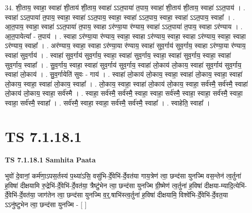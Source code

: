 \documentclass[17pt]{extarticle}
\begin{document}
34. शी॒ताय॒ स्वाहा॒ स्वाहा॑ शी॒ताय॑ शी॒ताय॒ स्वाहा॑ ऽऽत॒पाया॑ त॒पाय॒ स्वाहा॑ शी॒ताय॑ शी॒ताय॒ स्वाहा॑ ऽऽत॒पाय॑ । . स्वाहा॑ ऽऽत॒पाया॑ त॒पाय॒ स्वाहा॒ स्वाहा॑ ऽऽत॒पाय॒ स्वाहा॒ स्वाहा॑ ऽऽत॒पाय॒ स्वाहा॒ स्वाहा॑ ऽऽत॒पाय॒ स्वाहा᳚ । . आ॒त॒पाय॒ स्वाहा॒ स्वाहा॑ ऽऽत॒पाया॑ त॒पाय॒ स्वाहा ऽर॑ण्या॒या र॑ण्याय॒ स्वाहा॑ ऽऽत॒पाया॑ त॒पाय॒ स्वाहा ऽर॑ण्याय । . आ॒त॒पायेत्या᳚ - त॒पाय॑ । . स्वाहा ऽर॑ण्या॒या र॑ण्याय॒ स्वाहा॒ स्वाहा ऽर॑ण्याय॒ स्वाहा॒ स्वाहा ऽर॑ण्याय॒ स्वाहा॒ स्वाहा ऽर॑ण्याय॒ स्वाहा᳚ । . अर॑ण्याय॒ स्वाहा॒ स्वाहा ऽर॑ण्या॒या र॑ण्याय॒ स्वाहा॑ सुव॒र्गाय॑ सुव॒र्गाय॒ स्वाहा ऽर॑ण्या॒या र॑ण्याय॒ स्वाहा॑ सुव॒र्गाय॑ । . स्वाहा॑ सुव॒र्गाय॑ सुव॒र्गाय॒ स्वाहा॒ स्वाहा॑ सुव॒र्गाय॒ स्वाहा॒ स्वाहा॑ सुव॒र्गाय॒ स्वाहा॒ स्वाहा॑ सुव॒र्गाय॒ स्वाहा᳚ । . सु॒व॒र्गाय॒ स्वाहा॒ स्वाहा॑ सुव॒र्गाय॑ सुव॒र्गाय॒ स्वाहा॑ लो॒काय॑ लो॒काय॒ स्वाहा॑ सुव॒र्गाय॑ सुव॒र्गाय॒ स्वाहा॑ लो॒काय॑ । . सु॒व॒र्गायेति॑ सुवः - गाय॑ । . स्वाहा॑ लो॒काय॑ लो॒काय॒ स्वाहा॒ स्वाहा॑ लो॒काय॒ स्वाहा॒ स्वाहा॑ लो॒काय॒ स्वाहा॒ स्वाहा॑ लो॒काय॒ स्वाहा᳚ । . लो॒काय॒ स्वाहा॒ स्वाहा॑ लो॒काय॑ लो॒काय॒ स्वाहा॒ सर्व॑स्मै॒ सर्व॑स्मै॒ स्वाहा॑ लो॒काय॑ लो॒काय॒ स्वाहा॒ सर्व॑स्मै । . स्वाहा॒ सर्व॑स्मै॒ सर्व॑स्मै॒ स्वाहा॒ स्वाहा॒ सर्व॑स्मै॒ स्वाहा॒ स्वाहा॒ सर्व॑स्मै॒ स्वाहा॒ स्वाहा॒ सर्व॑स्मै॒ स्वाहा᳚ । . सर्व॑स्मै॒ स्वाहा॒ स्वाहा॒ सर्व॑स्मै॒ सर्व॑स्मै॒ स्वाहा᳚ । . स्वाहेति॒ स्वाहा᳚ । \newline
\pagebreak
{}

\section{ TS 7.1.18.1 }

\textbf{TS 7.1.18.1 } \newline
\textbf{Samhita Paata} \newline

भुवो॑ दे॒वानां॒ कर्म॑णा॒ऽपस॒र्तस्य॑ प॒थ्या॑ऽसि॒ वसु॑भि-र्दे॒वेभि॑-र्दे॒वत॑या गाय॒त्रेण॑ त्वा॒ छन्द॑सा युनज्मि वस॒न्तेन॑ त्व॒र्तुना॑ ह॒विषा॑ दीक्षयामि रु॒द्रेभि॑-र्दे॒वेभि॑-र्दे॒वत॑या॒ त्रैष्टु॑भेन त्वा॒ छन्द॑सा युनज्मि ग्री॒ष्मेण॑ त्व॒र्तुना॑ ह॒विषा॑ दीक्षया-म्यादि॒त्येभि॑-र्दे॒वेभि॑-र्दे॒वत॑या॒ जाग॑तेन त्वा॒ छन्द॑सा युनज्मि व॒र्॒.षाभि॑स्त्व॒र्तुना॑ ह॒विषा॑ दीक्षयामि॒ विश्वे॑भि-र्दे॒वेभि॑-र्दे॒वत॒या ऽऽनु॑ष्टुभेन त्वा॒ छन्द॑सा युनज्मि - [  ] \newline
\end{document}
